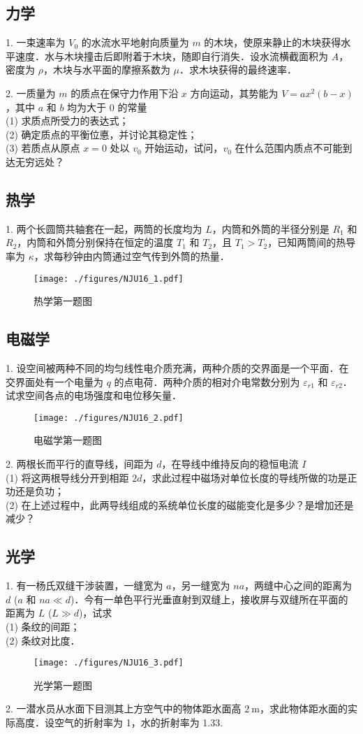 \subsection{力学}
1. 一束速率为 $V_{0}$ 的水流水平地射向质量为 $m$ 的木块，使原来静止的木块获得水平速度．水与木块撞击后即附着于木块，随即自行消失．设水流横截面积为 $A$，密度为 $\rho$，木块与水平面的摩擦系数为 $\mu$．求木块获得的最终速率．

2. 一质量为 $m$ 的质点在保守力作用下沿 $x$ 方向运动，其势能为 $V=a x^{2}(b-x)$，其中 $a$ 和 $b$ 均为大于 0 的常量\\
(1) 求质点所受力的表达式；\\
(2) 确定质点的平衡位悳，并讨论其稳定性；\\
(3) 若质点从原点 $x=0$ 处以 $v_{0}$ 开始运动，试问，$v_{0}$ 在什么范围内质点不可能到达无穷远处？
\subsection{热学}
1. 两个长圆筒共轴套在一起，两筒的长度均为 $L$，内筒和外筒的半径分别是 $R_{1}$ 和 $R_{2}$，内筒和外筒分别保持在恒定的温度 $T_{1}$ 和 $T_{2}$，且 $T_{1}>T_{2}$，已知两筒间的热导率为 $\kappa$，求每秒钟由内筒通过空气传到外筒的热量．
\begin{figure}[ht]
\centering
\texttt{[image: ./figures/NJU16\_1.pdf]}
\caption{热学第一题图} \label{NJU16_fig1}
\end{figure}
\subsection{电磁学}
1. 设空间被两种不同的均匀线性电介质充满，两种介质的交界面是一个平面．在交界面处有一个电量为 $q$ 的点电荷．两种介质的相对介电常数分别为 $\varepsilon_{r 1}$ 和 $\varepsilon_{r 2}$．试求空间各点的电场强度和电位移矢量．
\begin{figure}[ht]
\centering
\texttt{[image: ./figures/NJU16\_2.pdf]}
\caption{电磁学第一题图} \label{NJU16_fig2}
\end{figure}
2. 两根长而平行的直导线，间距为 $d$，在导线中维持反向的稳恒电流 $I$\\
(1) 将这两根导线分开到相距 $2 d$，求此过程中磁场对单位长度的导线所做的功是正功还是负功；\\
(2) 在上述过程中，此两导线组成的系统单位长度的磁能变化是多少？是增加还是减少？
\subsection{光学}
1. 有一杨氏双缝干涉装置，一缝宽为 $a$，另一缝宽为 $na$，两缝中心之间的距离为 $d$ ($a$ 和 $na \ll d$)．今有一单色平行光垂直射到双缝上，接收屏与双缝所在平面的距离为 $L$ ($L \gg d$)，试求\\
(1) 条纹的间距；\\
(2) 条纹对比度．
\begin{figure}[ht]
\centering
\texttt{[image: ./figures/NJU16\_3.pdf]}
\caption{光学第一题图} \label{NJU16_fig3}
\end{figure}
2. 一潜水员从水面下目测其上方空气中的物体距水面高 $2 \mathrm{~m}$，求此物体距水面的实际高度．设空气的折射率为 1，水的折射率为 1.33.

